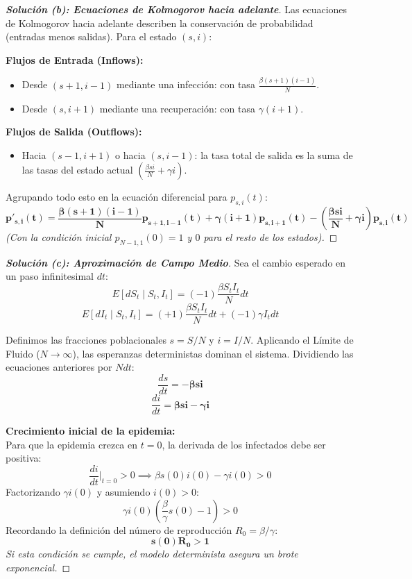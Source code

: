 \documentclass[10pt,a4paper]{article}
\begin{document}
\begin{proof}[\textbf{Solución (b): Ecuaciones de Kolmogorov hacia adelante}]
    Las ecuaciones de Kolmogorov hacia adelante describen la conservación de probabilidad (entradas menos salidas). Para el estado $(s, i)$:
    
    \textbf{Flujos de Entrada (Inflows):}
    \begin{itemize}
        \item Desde $(s+1, i-1)$ mediante una infección: con tasa $\frac{\beta (s+1)(i-1)}{N}$.
        \item Desde $(s, i+1)$ mediante una recuperación: con tasa $\gamma (i+1)$.
    \end{itemize}
    
    \textbf{Flujos de Salida (Outflows):}
    \begin{itemize}
        \item Hacia $(s-1, i+1)$ o hacia $(s, i-1)$: la tasa total de salida es la suma de las tasas del estado actual $\left( \frac{\beta s i}{N} + \gamma i \right)$.
    \end{itemize}
    
    Agrupando todo esto en la ecuación diferencial para $p_{s,i}(t)$:
    \[ \mathbf{p'_{s,i}(t) = \frac{\beta(s+1)(i-1)}{N} p_{s+1, i-1}(t) + \gamma(i+1) p_{s, i+1}(t) - \left( \frac{\beta s i}{N} + \gamma i \right) p_{s,i}(t)} \]
    \textit{(Con la condición inicial $p_{N-1, 1}(0) = 1$ y $0$ para el resto de los estados).}
\end{proof}

\vspace{5mm}

\begin{proof}[\textbf{Solución (c): Aproximación de Campo Medio}]
    Sea el cambio esperado en un paso infinitesimal $dt$:
    \[ E[dS_t \mid S_t, I_t] = (-1) \frac{\beta S_t I_t}{N} dt \]
    \[ E[dI_t \mid S_t, I_t] = (+1) \frac{\beta S_t I_t}{N} dt + (-1) \gamma I_t dt \]
    
    Definimos las fracciones poblacionales $s = S/N$ y $i = I/N$. Aplicando el Límite de Fluido ($N \to \infty$), las esperanzas deterministas dominan el sistema. Dividiendo las ecuaciones anteriores por $N dt$:
    \[ \frac{ds}{dt} = \mathbf{-\beta s i} \]
    \[ \frac{di}{dt} = \mathbf{\beta s i - \gamma i} \]
    
    \textbf{Crecimiento inicial de la epidemia:} \\
    Para que la epidemia crezca en $t=0$, la derivada de los infectados debe ser positiva:
    \[ \frac{di}{dt} \Big|_{t=0} > 0 \implies \beta s(0) i(0) - \gamma i(0) > 0 \]
    Factorizando $\gamma i(0)$ y asumiendo $i(0) > 0$:
    \[ \gamma i(0) \left( \frac{\beta}{\gamma} s(0) - 1 \right) > 0 \]
    Recordando la definición del número de reproducción $R_0 = \beta/\gamma$:
    \[ \mathbf{s(0)R_0 > 1} \]
    \textit{Si esta condición se cumple, el modelo determinista asegura un brote exponencial.}
\end{proof}
\end{document}
